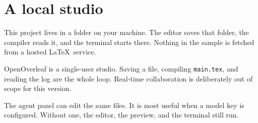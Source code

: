 \section{A local studio}

This project lives in a folder on your machine. The editor saves that
folder, the compiler reads it, and the terminal starts there. Nothing in
the sample is fetched from a hosted \LaTeX\ service.

OpenOverleaf is a single-user studio. Saving a file, compiling
\texttt{main.tex}, and reading the log are the whole loop. Real-time
collaboration is deliberately out of scope for this version.

The agent panel can edit the same files. It is most useful when a
model key is configured. Without one, the editor, the preview, and the
terminal still run.
